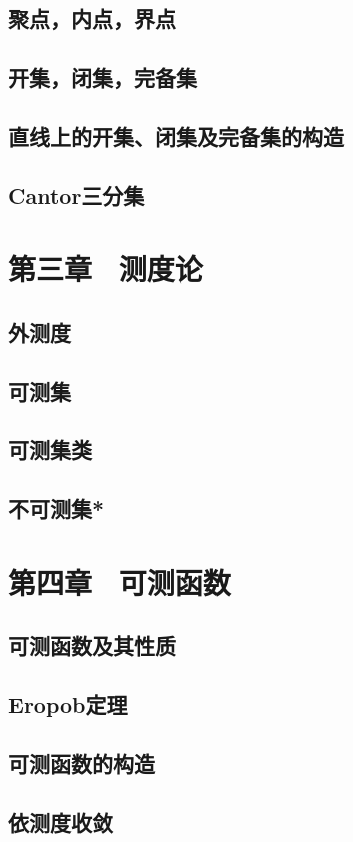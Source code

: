 \documentclass[oneside]{book} %
\begin{document}
\section{聚点，内点，界点}

\newpage
\section{开集，闭集，完备集}
\section{直线上的开集、闭集及完备集的构造}
\section{Cantor三分集}

\chapter{第三章 \ 测度论} 
\section{外测度}
\section{可测集}
\section{可测集类}
\section{不可测集*}

\chapter{第四章 \ 可测函数} 
\section{可测函数及其性质}
\section{Eropob定理}%
\section{可测函数的构造}
\section{依测度收敛}
\end{document}

